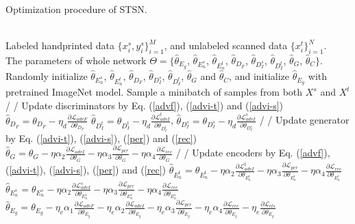 \documentclass[10pt,journal,compsoc,twocolumn ]{IEEEtran}
\begin{document}
\begin{algorithm}[htb]
\caption{ Optimization procedure of STSN.}
\label{al1}
\begin{algorithmic}[1]
\REQUIRE ~~\\
Labeled handprinted data $\{{x^{s}_{i}},{y^{s}_{i}}\}^{M}_{i=1}$, and unlabeled scanned data $\{{x^{t}_{i}}\}^{N}_{i=1}$.
\ENSURE ~~\\
The parameters of whole network $\Theta =\{\hat{\theta}_{E_g}$, $\hat{\theta}_{E_n^s}$, $\hat{\theta}_{E_n^t}$, $\hat{\theta}_{D_F}$, $\hat{\theta}_{D_I^s}$, $\hat{\theta}_{D_I^t}$, $\hat{\theta}_{G}$, $\hat{\theta}_C\}$.
\STATE Randomly initialize $\hat{\theta}_{E_n^s}$, $\hat{\theta}_{E_n^t}$, $\hat{\theta}_{D_F}$, $\hat{\theta}_{D_I^s}$, $\hat{\theta}_{D_I^t}$, $\hat{\theta}_{G}$ and $\hat{\theta}_C$, and initialize $\hat{\theta}_{E_g}$ with pretrained ImageNet model.
\REPEAT
\STATE Sample a minibatch of samples from both $X^s$ and $X^t$
\STATE / / Update discriminators by Eq. (\ref{advf}), (\ref{advi-t}) and (\ref{advi-s})
\STATE $\hat{\theta}_{D_F}=\theta_{D_F}-\eta_d \frac{\partial \mathcal{L}_{advF}}{\partial \theta_{D_F}}$
\STATE $\hat{\theta}_{D_I^t}=\theta_{D_I^t}-\eta_d \frac{\partial \mathcal{L}^{t}_{advI}}{\partial \theta_{D_I^t}}$, $\hat{\theta}_{D_I^s}=\theta_{D_I^s}-\eta_d \frac{\partial \mathcal{L}^{s}_{advI}}{\partial \theta_{D_I^s}}$
\STATE / / Update generator by Eq. (\ref{advi-t}), (\ref{advi-s}), (\ref{per}) and (\ref{rec})
\STATE $\hat{\theta}_{G}=\theta_{G}-\eta \alpha_2\frac{\partial \mathcal{L}_{advI} }{\partial \theta_{G}}-\eta \alpha_3\frac{\partial   \mathcal{L}_{per}}{\partial \theta_{G}}-\eta \alpha_4\frac{\partial\mathcal{L}_{rec} }{\partial \theta_{G}}$
\STATE / / Update encoders by Eq. (\ref{advf}), (\ref{advi-t}), (\ref{advi-s}), (\ref{per}) and (\ref{rec})
\STATE $\hat{\theta}_{E_n^t}=\theta_{E_n^t}-\eta\alpha_2\frac{\partial \mathcal{L}^{t}_{advI}}{\partial \theta_{E_n^t}}-\eta\alpha_3\frac{\partial\mathcal{L}_{per}}{\partial \theta_{E_n^t}}-\eta\alpha_4\frac{\partial\mathcal{L}_{rec} }{\partial \theta_{E_n^t}}$
\STATE $\hat{\theta}_{E_n^s}=\theta_{E_n^s}-\eta\alpha_2\frac{\partial \mathcal{L}^{s}_{advI}}{\partial \theta_{E_n^s}}-\eta\alpha_3\frac{\partial\mathcal{L}_{per}}{\partial \theta_{E_n^s}}-\eta\alpha_4\frac{\partial\mathcal{L}_{rec} }{\partial \theta_{E_n^s}}$
\STATE $\hat{\theta}_{E_g}=\theta_{E_g}-\eta_e\alpha_1 \frac{\partial \mathcal{L}_{advF} }{\partial \theta_{E_g}}-\eta_e\alpha_2\frac{\partial\mathcal{L}_{advI}}{\partial \theta_{E_g}}-\eta_e\alpha_3\frac{\partial\mathcal{L}_{per}}{\partial \theta_{E_g}}-\eta_e\alpha_4\frac{\partial\mathcal{L}_{rec}}{\partial \theta_{E_g}}-\eta_e \frac{\partial\mathcal{L}_{cls} }{\partial \theta_{E_g}}$

\end{algorithmic}
\end{algorithm}
\end{document}
